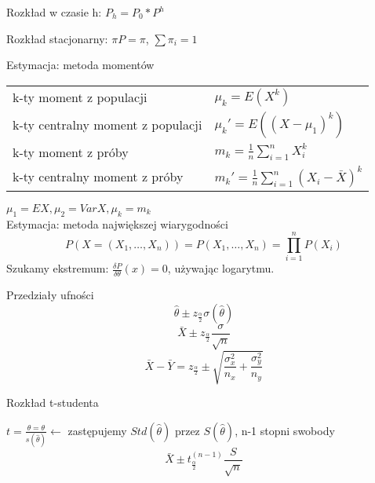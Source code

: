 \documentclass[a4paper]{article}
\begin{document}
    Rozkład w czasie h: $P_h = P_0 * P^h$

    Rozkład stacjonarny: $\pi P = \pi$, $\sum \pi_i = 1$

    Estymacja: metoda momentów

    \begin{table}[H]
        \begin{center}
            \begin{tabular}{ p{} p{}}
                k-ty moment z populacji &
                $\mu_k = E(X^k)$\\

                k-ty centralny moment z populacji &
                $\mu_k' = E((X - \mu_1)^k)$\\

                k-ty moment z próby &
                $m_k = \frac{1}{n} \sum_{i=1}^n X_i^k$\\

                k-ty centralny moment z próby &
                $m_k' = \frac{1}{n} \sum_{i=1}^n (X_i - \bar{X})^k$
            \end{tabular}
        \end{center}
    \end{table}

    $\mu_1 = EX, \mu_2 = VarX, \mu_k = m_k$\\

    Estymacja: metoda największej wiarygodności
    \begin{equation*}
        P(X = (X_1, \dots, X_n)) = P(X_1, \dots, X_n) = \prod_{i=1}^n P(X_i)
    \end{equation*}
    Szukamy ekstremum: $\frac{\delta P}{\delta \theta} (x) = 0$, używając logarytmu.


    Przedziały ufności
    \begin{equation*}
        \hat{\theta} \pm z_{\frac{\alpha}{2}} \sigma(\hat{\theta})
    \end{equation*}
    \begin{equation*}
    \bar{X} \pm z_{\frac{\alpha}{2}} \frac{\sigma}{\sqrt{n}}
    \end{equation*}
    \begin{equation*}
\bar{X} - \bar{Y} = z_{\frac{\alpha}{2}} \pm \sqrt{\frac{\sigma_x^2}{n_x} + \frac{\sigma_y^2}{n_y}}
    \end{equation*}

    Rozkład t-studenta

    $t = \frac{\hat{\theta} = \theta}{s(\hat{\theta})} \leftarrow$ zastępujemy $Std(\hat{\theta})$ przez $S(\hat{\theta})$,
    n-1 stopni swobody
    \begin{equation*}
        \bar{X} \pm t_{\frac{\alpha}{2}}^{(n-1)} \frac{S}{\sqrt{n}}
    \end{equation*}
\end{document}
